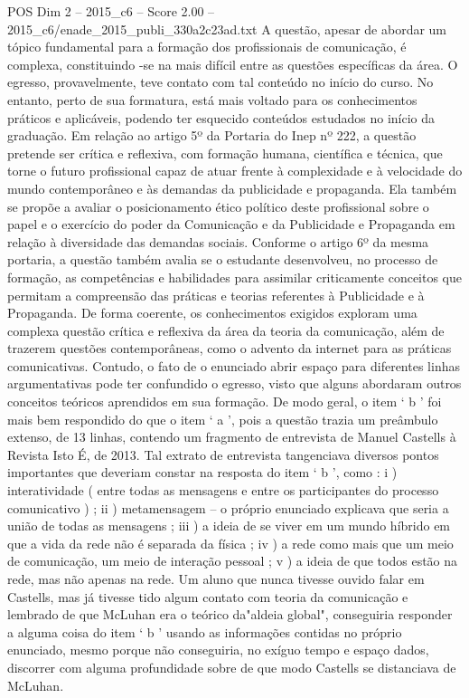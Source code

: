 \begin{textsample}{POS Dim 2 – 2015\_c6 – Score 2.00 – 2015\_c6/enade\_2015\_publi\_330a2c23ad.txt}
A questão, apesar de abordar um tópico fundamental para a formação dos profissionais de comunicação, é complexa, constituindo -se na mais difícil entre as questões específicas da área.
O egresso, provavelmente, teve contato com tal conteúdo no início do curso.
No entanto, perto de sua formatura, está mais voltado para os conhecimentos práticos e aplicáveis, podendo ter esquecido conteúdos estudados no início da graduação.
Em relação ao artigo 5º da Portaria do Inep nº 222, a questão pretende ser crítica e reflexiva, com formação humana, científica e técnica, que torne o futuro profissional capaz de atuar frente à complexidade e à velocidade do mundo contemporâneo e às demandas da publicidade e propaganda.
Ela também se propõe a avaliar o posicionamento ético político deste profissional sobre o papel e o exercício do poder da Comunicação e da Publicidade e Propaganda em relação à diversidade das demandas sociais.
Conforme o artigo 6º da mesma portaria, a questão também avalia se o estudante desenvolveu, no processo de formação, as competências e habilidades para assimilar criticamente conceitos que permitam a compreensão das práticas e teorias referentes à Publicidade e à Propaganda.
De forma coerente, os conhecimentos exigidos exploram uma complexa questão crítica e reflexiva da área da teoria da comunicação, além de trazerem questões contemporâneas, como o advento da internet para as práticas comunicativas.
Contudo, o fato de o enunciado abrir espaço para diferentes linhas argumentativas pode ter confundido o egresso, visto que alguns abordaram outros conceitos teóricos aprendidos em sua formação.
De modo geral, o item ‘ b ’ foi mais bem respondido do que o item ‘ a ’, pois a questão trazia um preâmbulo extenso, de 13 linhas, contendo um fragmento de entrevista de Manuel Castells à Revista Isto É, de 2013.
Tal extrato de entrevista tangenciava diversos pontos importantes que deveriam constar na resposta do item ‘ b ’, como : i ) interatividade ( entre todas as mensagens e entre os participantes do processo comunicativo ) ; ii ) metamensagem – o próprio enunciado explicava que seria a união de todas as mensagens ; iii ) a ideia de se viver em um mundo híbrido em que a vida da rede não é separada da física ; iv ) a rede como mais que um meio de comunicação, um meio de interação pessoal ; v ) a ideia de que todos estão na rede, mas não apenas na rede.
Um aluno que nunca tivesse ouvido falar em Castells, mas já tivesse tido algum contato com teoria da comunicação e lembrado de que McLuhan era o teórico da"aldeia global", conseguiria responder a alguma coisa do item ‘ b ’ usando as informações contidas no próprio enunciado, mesmo porque não conseguiria, no exíguo tempo e espaço dados, discorrer com alguma profundidade sobre de que modo Castells se distanciava de McLuhan.

\end{textsample}
